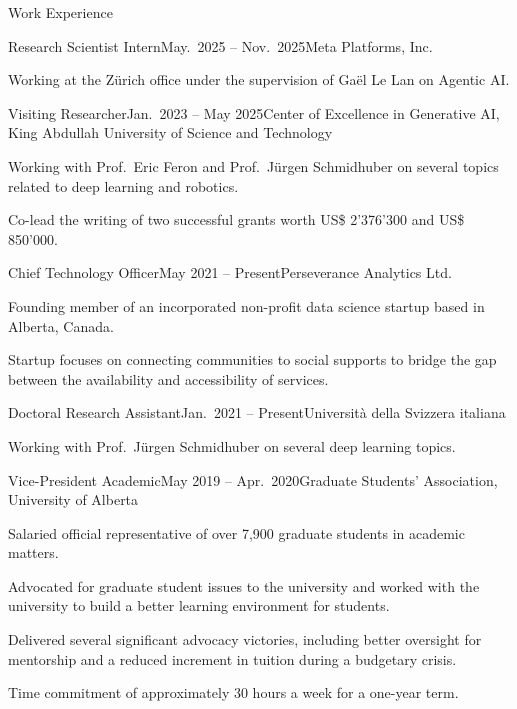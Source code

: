 \documentclass{cv}
\begin{document}
\begin{rSection}{Work Experience}

\begin{rSubsection}{Research Scientist Intern}{May.\ 2025 -- Nov.\ 2025}{Meta Platforms, Inc.}
    \item Working at the Z{\"u}rich office under the supervision of Ga{\"e}l Le Lan on Agentic AI.
\end{rSubsection}

\begin{rSubsection}{Visiting Researcher}{Jan.\ 2023 -- May 2025}{Center of Excellence in Generative AI, King Abdullah University of Science and Technology}
    \item Working with Prof.\ Eric Feron and Prof.\ J{\"{u}}rgen Schmidhuber on several topics related to deep learning and robotics.
    \item Co-lead the writing of two successful grants worth US\$ 2'376'300 and US\$ 850'000.
\end{rSubsection}

\begin{rSubsection}{Chief Technology Officer}{May 2021 -- Present}{Perseverance Analytics Ltd.}
    \item Founding member of an incorporated non-profit data science startup based in Alberta, Canada.
    \item Startup focuses on connecting communities to social supports to bridge the gap between the availability and accessibility of services.
\end{rSubsection}

\begin{rSubsection}{Doctoral Research Assistant}{Jan.\ 2021 -- Present}{Universit{\`{a}} della Svizzera italiana}
    \item Working with Prof.\ J{\"{u}}rgen Schmidhuber on several deep learning topics.
\end{rSubsection}

\begin{rSubsection}{Vice-President Academic}{May 2019 -- Apr.\ 2020}{Graduate Students' Association, University of Alberta}
    \item Salaried official representative of over 7,900 graduate students in academic matters.
    \item Advocated for graduate student issues to the university and worked with the university to build a better learning environment for students.
    \item Delivered several significant advocacy victories, including better oversight for mentorship and a reduced increment in tuition during a budgetary crisis.
    \item Time commitment of approximately 30 hours a week for a one-year term.
\end{rSubsection}


\end{rSection}
\end{document}
